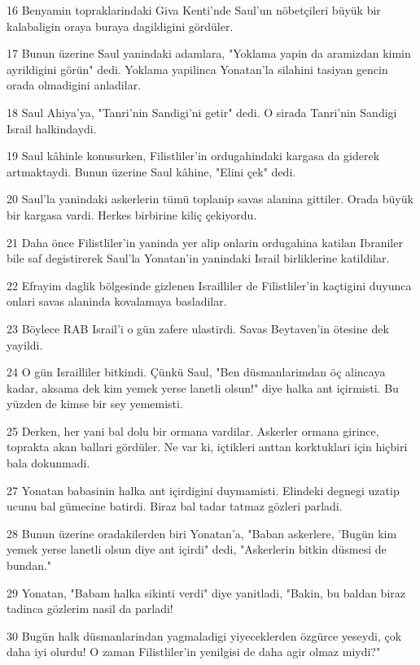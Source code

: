 \par 16 Benyamin topraklarindaki Giva Kenti'nde Saul'un nöbetçileri büyük bir kalabaligin oraya buraya dagildigini gördüler.
\par 17 Bunun üzerine Saul yanindaki adamlara, "Yoklama yapin da aramizdan kimin ayrildigini görün" dedi. Yoklama yapilinca Yonatan'la silahini tasiyan gencin orada olmadigini anladilar.
\par 18 Saul Ahiya'ya, "Tanri'nin Sandigi'ni getir" dedi. O sirada Tanri'nin Sandigi Israil halkindaydi.
\par 19 Saul kâhinle konusurken, Filistliler'in ordugahindaki kargasa da giderek artmaktaydi. Bunun üzerine Saul kâhine, "Elini çek" dedi.
\par 20 Saul'la yanindaki askerlerin tümü toplanip savas alanina gittiler. Orada büyük bir kargasa vardi. Herkes birbirine kiliç çekiyordu.
\par 21 Daha önce Filistliler'in yaninda yer alip onlarin ordugahina katilan Ibraniler bile saf degistirerek Saul'la Yonatan'in yanindaki Israil birliklerine katildilar.
\par 22 Efrayim daglik bölgesinde gizlenen Israilliler de Filistliler'in kaçtigini duyunca onlari savas alaninda kovalamaya basladilar.
\par 23 Böylece RAB Israil'i o gün zafere ulastirdi. Savas Beytaven'in ötesine dek yayildi.
\par 24 O gün Israilliler bitkindi. Çünkü Saul, "Ben düsmanlarimdan öç alincaya kadar, aksama dek kim yemek yerse lanetli olsun!" diye halka ant içirmisti. Bu yüzden de kimse bir sey yememisti.
\par 25 Derken, her yani bal dolu bir ormana vardilar. Askerler ormana girince, toprakta akan ballari gördüler. Ne var ki, içtikleri anttan korktuklari için hiçbiri bala dokunmadi.
\par 27 Yonatan babasinin halka ant içirdigini duymamisti. Elindeki degnegi uzatip ucunu bal gümecine batirdi. Biraz bal tadar tatmaz gözleri parladi.
\par 28 Bunun üzerine oradakilerden biri Yonatan'a, "Baban askerlere, 'Bugün kim yemek yerse lanetli olsun diye ant içirdi" dedi, "Askerlerin bitkin düsmesi de bundan."
\par 29 Yonatan, "Babam halka sikinti verdi" diye yanitladi, "Bakin, bu baldan biraz tadinca gözlerim nasil da parladi!
\par 30 Bugün halk düsmanlarindan yagmaladigi yiyeceklerden özgürce yeseydi, çok daha iyi olurdu! O zaman Filistliler'in yenilgisi de daha agir olmaz miydi?"
